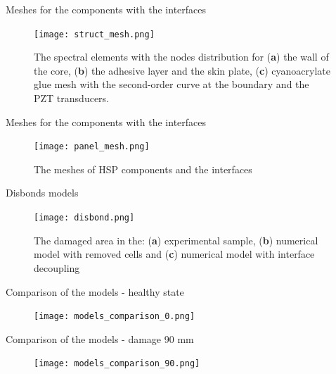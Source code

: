 \documentclass[10pt]{beamer} %
\begin{document}
\begin{frame}[label=frame9]{Meshes for the components with the interfaces}

\begin{figure}

	\texttt{[image: struct\_mesh.png]}

	\caption{The spectral elements with the nodes distribution for (\textbf{a}) the wall of the core, (\textbf{b}) the adhesive layer and the skin plate, (\textbf{c}) cyanoacrylate glue mesh with the second-order curve at the boundary and the PZT transducers.}

	\label{fig:elements}

\end{figure}

\end{frame}

	\begin{frame}[label=frame10]{Meshes for the components with the interfaces}

		\begin{figure}

			\texttt{[image: panel\_mesh.png]}

			\caption{The meshes of HSP components and the interfaces}

			\label{fig:panel_mesh}

		\end{figure}

	\end{frame}

	\begin{frame}[label=frame11]{Disbonds models}

		\begin{figure}

			\texttt{[image: disbond.png]}

			\caption{The damaged area in the: (\textbf{a}) experimental sample, (\textbf{b}) numerical model with removed cells and (\textbf{c}) numerical model with interface decoupling}

			\label{fig:disbonds}

		\end{figure}

	\end{frame}

\begin{frame}[label=frame11]{Comparison of the models - healthy state}

	\begin{figure}

		\texttt{[image: models\_comparison\_0.png]}

		
	\end{figure}

\end{frame}
\begin{frame}[label=frame11]{Comparison of the models - damage 90 mm}

	\begin{figure}

		\texttt{[image: models\_comparison\_90.png]}
	\end{figure}

\end{frame}
\end{document}
